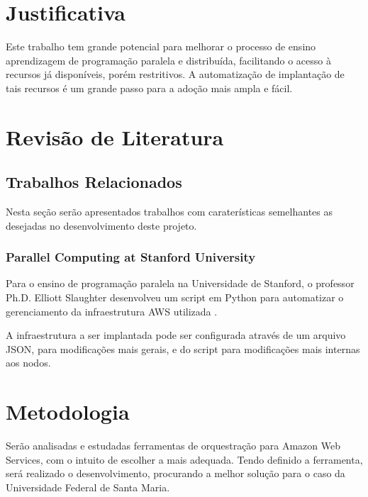 \documentclass[12pt]{article}
\begin{document}
\section{Justificativa}
Este trabalho tem grande potencial para melhorar o processo de ensino aprendizagem de programação paralela e distribuída, facilitando o acesso à recursos já disponíveis, porém restritivos. A automatização de implantação de tais recursos é um grande passo para a adoção mais ampla e fácil.


\section{Revisão de Literatura}

\subsection{Trabalhos Relacionados}
Nesta seção serão apresentados trabalhos com caraterísticas semelhantes as desejadas no desenvolvimento deste projeto.

\subsubsection{Parallel Computing at Stanford University}
Para o ensino de programação paralela na Universidade de Stanford, o professor Ph.D. Elliott Slaughter desenvolveu um script em Python para automatizar o gerenciamento da infraestrutura AWS utilizada \cite{stanford}.

A infraestrutura a ser implantada pode ser configurada através de um arquivo JSON, para modificações mais gerais, e do script para modificações mais internas aos nodos.

\section{Metodologia}
Serão analisadas e estudadas ferramentas de orquestração para Amazon Web Services, com o intuito de escolher a mais adequada. Tendo definido a ferramenta, será realizado o desenvolvimento, procurando a melhor solução para o caso da Universidade Federal de Santa Maria.
\end{document}

